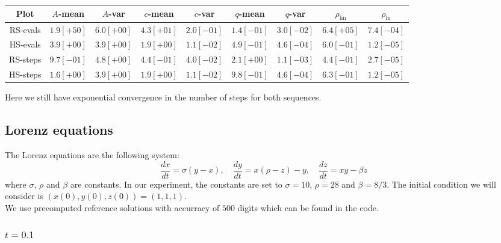 \begin{table}[H]
    \centering
    \small
    \begin{tabular}{c||c|c|c|c|c|c|c|c}
Plot & \(A\)-mean & \(A\)-var & \(c\)-mean & \(c\)-var & \(q\)-mean & \(q\)-var & \(\rho_{\operatorname{lin}}\) & \(\rho_{\ln}\)\\\hline
\rowcolor{red}
RS-evals & \(1.9[+50]\) & \(6.0[+00]\) & \(4.3[+01]\) & \(2.0[-01]\) & \(1.4[-01]\) & \(3.0[-02]\) & \(6.4[+05]\) & \(7.4[-04]\) \\
\rowcolor{green}
HS-evals & \(3.9[+00]\) & \(3.9[+00]\) & \(1.9[+00]\) & \(1.1[-02]\) & \(4.9[-01]\) & \(4.6[-04]\) & \(6.0[-01]\) & \(1.2[-05]\) \\
\rowcolor{green}
RS-steps & \(9.7[-01]\) & \(4.8[+00]\) & \(4.4[-01]\) & \(4.0[-02]\) & \(2.1[+00]\) & \(1.1[-03]\) & \(4.4[-01]\) & \(2.7[-05]\) \\
\rowcolor{green}
HS-steps & \(1.6[+00]\) & \(3.9[+00]\) & \(1.9[+00]\) & \(1.1[-02]\) & \(9.8[-01]\) & \(4.6[-04]\) & \(6.3[-01]\) & \(1.2[-05]\) \\
    \end{tabular}
    \label{tab:my_label}
\end{table}

Here we still have exponential convergence in the number of steps for both sequences.

\subsection{Lorenz equations}

The Lorenz equations are the following system: 
\[
\frac{dx}{dt} = \sigma (y-x),\quad \frac{dy}{dt} = x(\rho - z) - y,\quad \frac{dz}{dt} = xy - \beta z
\]
where \(\sigma,\,\rho\) and \(\beta\) are constants. In our experiment, the constants are set to \(\sigma = 10\), \(\rho = 28\) and \(\beta = 8/3\). The initial condition we will consider is \((x(0),y(0),z(0)) = (1,1,1)\).\\

We use precomputed reference solutions with accurracy of \(500\) digits which can be found in the code.

\subsubsection{\(t = 0.1\)}

